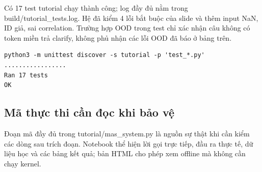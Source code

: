 Có 17 test tutorial chạy thành công; log đầy đủ nằm trong
build/tutorial\_tests.log. Hệ đã kiểm 4 lỗi bắt buộc của slide và thêm
input NaN, ID giả, sai correlation. Trường hợp OOD trong test chỉ xác
nhận câu không có token miền trả clarify, không phủ nhận các lỗi OOD đã
báo ở bảng trên.

\begin{verbatim}
python3 -m unittest discover -s tutorial -p 'test_*.py'
.................
Ran 17 tests
OK
\end{verbatim}

\subsection{Mã thực thi cần đọc khi bảo
vệ}\label{muxe3-thux1ef1c-thi-cux1ea7n-ux111ux1ecdc-khi-bux1ea3o-vux1ec7}




Đoạn mã đầy đủ trong tutorial/mas\_system.py là nguồn sự thật khi cần
kiểm các dòng sau trích đoạn. Notebook thể hiện lời gọi trực tiếp, đầu
ra thực tế, dữ liệu học và các bảng kết quả; bản HTML cho phép xem
offline mà không cần chạy kernel.
